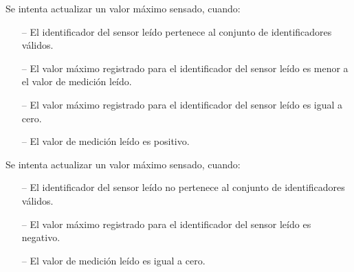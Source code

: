 
\begin{tcolorbox}[colback=gray!5!white,colframe=gray!50!black,
  colbacktitle=gray!75!black,title=KeepMaxReading\_SP\_4]
  Se intenta actualizar un valor máximo sensado, cuando:
     \begin{itemize}
        \item[--]{El identificador del sensor leído pertenece al conjunto de identificadores válidos.}
        \item[--]{El valor máximo registrado para el identificador del sensor leído es menor a el valor de medición leído.}
        \item[--]{El valor máximo registrado para el identificador del sensor leído es igual a cero.}
        \item[--]{El valor de medición leído es positivo.}
     \end{itemize}
\end{tcolorbox}



\begin{tcolorbox}[colback=gray!5!white,colframe=gray!50!black,
  colbacktitle=gray!75!black,title=KeepMaxReading\_SP\_7]
  Se intenta actualizar un valor máximo sensado, cuando:
     \begin{itemize}
        \item[--]{El identificador del sensor leído no pertenece al conjunto de identificadores válidos.}
        \item[--]{El valor máximo registrado para el identificador del sensor leído es negativo.}
        \item[--]{El valor de medición leído es igual a cero.}
     \end{itemize}
\end{tcolorbox}

